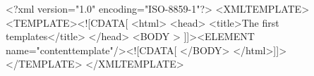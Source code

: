 <?xml version="1.0" encoding="ISO-8859-1"?> <XMLTEMPLATE>
    <TEMPLATE><![CDATA[
        <html>
            <head>
                <title>The first templates</title>
            </head>
            <BODY >
                ]]><ELEMENT name="contenttemplate"/><![CDATA[
            </BODY>
        </html>]]>
    </TEMPLATE>
</XMLTEMPLATE>
